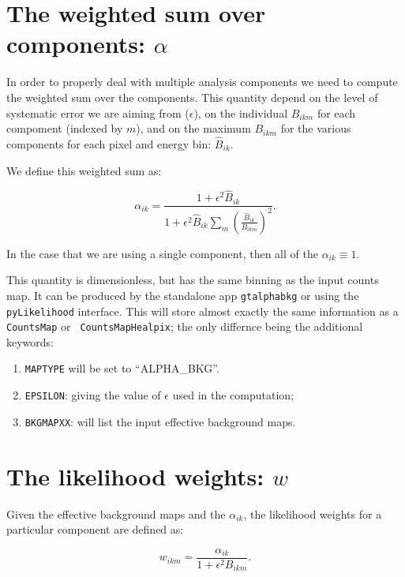 \documentclass[preprint]{aastex}
\begin{document}
\section{The weighted sum over components: $\alpha$}

In order to properly deal with multiple analysis components we
need to compute the weighted sum over the components.  This 
quantity depend on the level of systematic error we are aiming from ($\epsilon$),
on the individual $B_{ikm}$ for each compoment (indexed by $m$), and on the
maximum $B_{ikm}$ for the various components for each pixel and energy bin: $\hat{B}_{ik}$.

We define this weighted sum as:

\begin{equation}
\alpha_{ik} = \frac{1 + \epsilon^2 \hat{B}_{ik}}{1 + \epsilon^2 \hat{B}_{ik} \sum_{m} (\frac{\hat{B}_{ik}}{B_{ikm}})^2 }.
\end{equation}

\noindent In the case that we are using a single component, then all of the $\alpha_{ik} \equiv 1$.

This quantity is dimensionless, but has the same binning as the input
counts map.  It can be produced by the standalone app {\tt gtalphabkg}
or using the {\tt pyLikelihood} interface.  This will store almost
exactly the same information as a {\tt CountsMap} or {\tt
  CountsMapHealpix}; the only differnce being the additional keywords:
\begin{enumerate}
\item{{\tt MAPTYPE} will be set to ``ALPHA_BKG''.}
\item{{\tt EPSILON}: giving the value of $\epsilon$ used in the computation;}
\item{{\tt BKGMAPXX}: will list the input effective background maps.}    
\end{enumerate}



\section{The likelihood weights: $w$}

Given the effective background maps and the $\alpha_{ik}$, the likelihood weights for a particular
component are defined as:

\begin{equation}
w_{ikm} = \frac{\alpha_{ik}}{1 + \epsilon^2 B_{ikm}}.
\end{equation}
\end{document}
